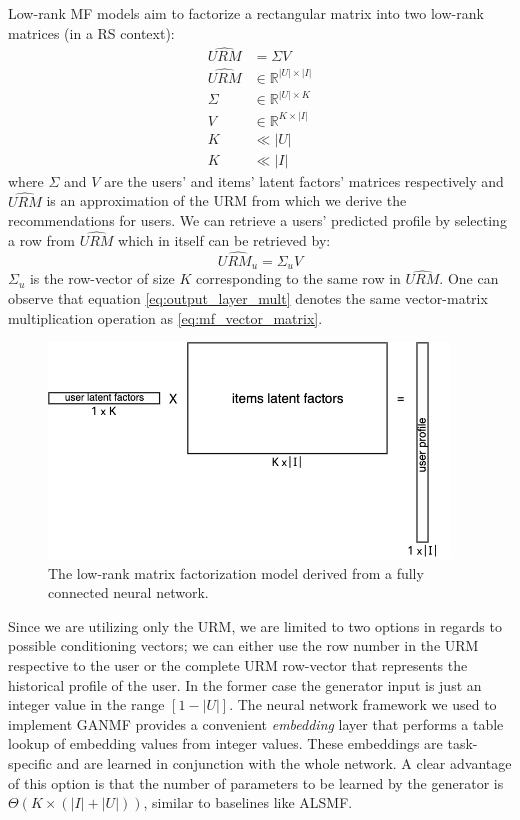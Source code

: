 Low-rank MF models aim to factorize a rectangular matrix into two low-rank matrices (in a RS context):
\[
\begin{split}
    \hat{URM} & = \Sigma V \\
    \hat{URM} & \in \mathbb{R}^{|U| \times |I|} \\
    \Sigma & \in \mathbb{R}^{|U| \times K} \\
    V & \in \mathbb{R}^{K \times |I|} \\
    K & \ll |U| \\
    K & \ll |I|
\end{split}
\]
where $\Sigma$ and $V$ are the users' and items' latent factors' matrices respectively and $\hat{URM}$ is an approximation of the URM from which we derive the recommendations for users. We can retrieve a users' predicted profile by selecting a row from $\hat{URM}$ which in itself can be retrieved by:
\begin{equation}
    \hat{URM_{u}} = \Sigma_{u}V
    \label{eq:mf_vector_matrix}
\end{equation}
$\Sigma_{u}$ is the row-vector of size $K$ corresponding to the same row in $\hat{URM}$. One can observe that equation \ref{eq:output_layer_mult} denotes the same vector-matrix multiplication operation as \ref{eq:mf_vector_matrix}.

\begin{figure}[h!]
    \centering
    \includegraphics[width=0.95\textwidth]{model/vector-matrix.png}
    \caption{The low-rank matrix factorization model derived from a fully connected neural network.}
    \label{fig:vector_matrix}
\end{figure}

Since we are utilizing only the URM, we are limited to two options in regards to possible conditioning vectors; we can either use the row number in the URM respective to the user or the complete URM row-vector that represents the historical profile of the user. In the former case the generator input is just an integer value in the range $[1-|U|]$. The neural network framework we used to implement GANMF provides a convenient \emph{embedding} layer that performs a table lookup of embedding values from integer values. These embeddings are task-specific and are learned in conjunction with the whole network. A clear advantage of this option is that the number of parameters to be learned by the generator is $\Theta(K\times(|I|+|U|))$, similar to baselines like ALSMF. 

